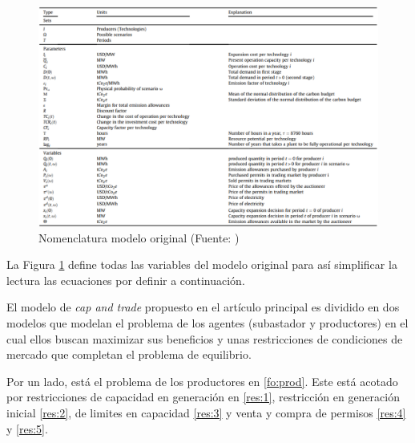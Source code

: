\begin{figure}[htp]
    \centering
    \includegraphics[width=15cm]{docs/DocumentoMemoria/core/images/Tabla amigo.png}
    \caption{Nomenclatura modelo original (Fuente: \protect{})}
    \label{fig:nomenclatura1}
\end{figure}

La Figura \ref{fig:nomenclatura1} define todas las variables del modelo original para así simplificar la lectura las ecuaciones por definir a continuación.
\vspace{2.5mm}

El modelo de \textit{cap and trade} propuesto en el artículo principal es dividido en dos modelos que modelan el problema de los agentes (subastador y productores) en el cual ellos buscan maximizar sus beneficios y unas restricciones de condiciones de mercado que completan el problema de equilibrio.
\vspace{2.5mm}

Por un lado, está el problema de los productores en \ref{fo:prod}. Este está acotado por restricciones de capacidad en generación en \ref{res:1}, restricción en generación inicial \ref{res:2}, de limites en capacidad \ref{res:3} y venta y compra de permisos \ref{res:4} y \ref{res:5}. 

